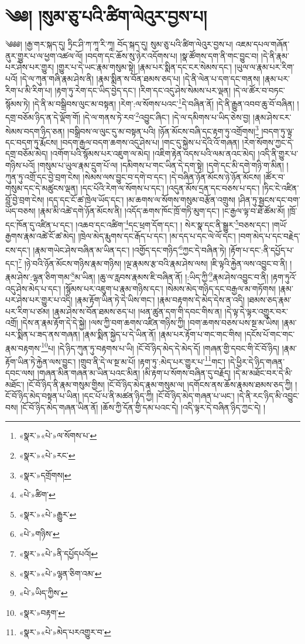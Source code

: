 \chapter{༄༅། །སུམ་ཅུ་པའི་ཚིག་ལེའུར་བྱས་པ།}༄༅༅། །རྒྱ་གར་སྐད་དུ། ཏྲིང་ཤི་ཀ་ཀཱ་རི་ཀཱ། བོད་སྐད་དུ། སུམ་ཅུ་པའི་ཚིག་ལེའུར་བྱས་པ། འཇམ་དཔལ་གཞོན་ནུར་གྱུར་པ་ལ་ཕྱག་འཚལ་ལོ། །བདག་དང་ཆོས་སུ་ཉེར་འདོགས་པ། །སྣ་ཚོགས་དག་ནི་གང་བྱུང་བ། །དེ་ནི་རྣམ་པར་ཤེས་པར་གྱུར། །གྱུར་པ་དེ་ཡང་རྣམ་གསུམ་སྟེ། །རྣམ་པར་སྨིན་དང་ངར་སེམས་དང་། །ཡུལ་ལ་རྣམ་པར་རིག་པའོ། །དེ་ལ་ཀུན་གཞི་རྣམ་ཤེས་ནི། །རྣམ་སྨིན་ས་བོན་ཐམས་ཅད་པ། །དེ་ནི་ལེན་པ་དག་དང་གནས། །རྣམ་པར་རིག་པ་མི་རིག་པ། །རྟག་ཏུ་རེག་དང་ཡིད་བྱེད་དང་། །རིག་དང་འདུ་ཤེས་སེམས་པར་ལྡན། །དེ་ལ་ཚོར་བ་བཏང་སྙོམས་ཏེ། །དེ་ནི་མ་བསྒྲིབས་ལུང་མ་བསྟན། །རེག་:ལ་སོགས་པའང་\footnote{«སྣར་»«པེ་»ལ་སོགས་པ་}དེ་བཞིན་ནོ། །དེ་ནི་རྒྱུན་འབབ་ཆུ་བོ་བཞིན། །དགྲ་བཅོམ་ཉིད་ན་དེ་ལྡོག་གོ། །དེ་ལ་གནས་ཏེ་རབ་\footnote{«སྣར་»«པེ་»རང་}འབྱུང་ཞིང་། །དེ་ལ་དམིགས་པ་ཡིད་ཅེས་བྱ། །རྣམ་ཤེས་ངར་སེམས་བདག་ཉིད་ཅན། །བསྒྲིབས་ལ་ལུང་དུ་མ་བསྟན་པའི། །ཉོན་མོངས་བཞི་དང་རྟག་ཏུ་འགྲོགས།\footnote{«སྣར་»དགྲོགས།} །བདག་ཏུ་ལྟ་དང་བདག་ཏུ་རྨོངས། །བདག་རྒྱལ་བདག་ཆགས་འདུ་ཤེས་པ། །གང་དུ་སྐྱེས་པ་དེའི་འོ་གཞན། །རེག་སོགས་ཀྱང་དེ་དགྲ་བཅོམ་མེད། །འགོག་པའི་སྙོམས་པར་འཇུག་ལ་མེད། །འཇིག་རྟེན་འདས་པའི་ལམ་ནའང་མེད། །འདི་ནི་གྱུར་པ་གཉིས་པའོ། །གསུམ་པ་ཡུལ་རྣམ་དྲུག་པོ་ལ། །དམིགས་པ་གང་ཡིན་དེ་དག་སྟེ། །དགེ་དང་མི་དགེ་གཉི་ག་མིན། །ཀུན་ཏུ་འགྲོ་དང་བྱེ་བྲག་ངེས། །སེམས་ལས་བྱུང་བ་དགེ་བ་དང་། །དེ་བཞིན་ཉོན་མོངས་ཉེ་ཉོན་མོངས། །ཚོར་བ་གསུམ་དང་དེ་མཚུངས་ལྡན། །དང་པོའི་རེག་ལ་སོགས་པ་དང་། །འདུན་མོས་དྲན་དང་བཅས་པ་དང་། །ཏིང་ངེ་འཛིན་བློ་བྱེ་བྲག་ངེས། །དད་དང་ངོ་ཚ་ཁྲེལ་ཡོད་དང་། །མ་ཆགས་ལ་སོགས་གསུམ་བརྩོན་འགྲུས། །ཤིན་ཏུ་སྦྱངས་དང་བག་ཡོད་བཅས། །རྣམ་མི་འཚེ་དགེ་ཉོན་མོངས་ནི། །འདོད་ཆགས་ཁོང་ཁྲོ་གཏི་མུག་དང་། །ང་རྒྱལ་ལྟ་བ་ཐེ་ཚོམ་མོ། །ཁྲོ་དང་ཁོན་དུ་འཛིན་པ་དང་། །འཆབ་དང་འཚིག་\footnote{«པེ་»ཚིག་}དང་ཕྲག་དོག་དང་། །
སེར་སྣ་དང་ནི་སྒྱུར་\footnote{«སྣར་»«པེ་»རྒྱུར་}བཅས་དང་། །གཡོ་རྒྱགས་རྣམ་འཚེ་ངོ་ཚ་མེད། །ཁྲེལ་མེད་རྨུགས་དང་རྒོད་པ་དང་། །མ་དད་པ་དང་ལེ་ལོ་དང་། །བག་མེད་པ་དང་བརྗེད་ངས་དང་། །རྣམ་གཡེང་ཤེས་བཞིན་མ་ཡིན་དང་། །འགྱོད་དང་གཉིད་\footnote{«པེ་»གཉིས་}ཀྱང་དེ་བཞིན་ཏེ། །རྟོག་པ་དང་:ནི་དཔྱོད་པ་དང་།\footnote{«སྣར་»«པེ་»ནི་དཔྱོདཔའོ།} །ཉེ་བའི་ཉོན་མོངས་གཉིས་རྣམ་གཉིས། །ལྔ་རྣམས་རྩ་བའི་རྣམ་ཤེས་ལས། །ཇི་ལྟའི་རྐྱེན་ལས་འབྱུང་བ་ནི། །རྣམ་ཤེས་:ལྷན་ཅིག་གམ་\footnote{«སྣར་»«པེ་»ལྷན་ཅིག་འམ་}མ་ཡིན། །ཆུ་ལ་རླབས་རྣམས་ཇི་བཞིན་ནོ། །:ཡིད་ཀྱི་\footnote{«པེ་»ཡིད་ཀྱིས་}རྣམ་ཤེས་འབྱུང་བ་ནི། །རྟག་ཏུའོ་འདུ་ཤེས་མེད་པ་དང་། །སྙོམས་པར་འཇུག་པ་རྣམ་གཉིས་དང་། །སེམས་མེད་གཉིད་དང་བརྒྱལ་མ་གཏོགས། །རྣམ་པར་ཤེས་པར་གྱུར་པ་འདི། །རྣམ་རྟོག་ཡིན་ཏེ་དེ་ཡིས་གང་། །རྣམ་བརྟགས་དེ་མེད་དེས་ན་འདི། །ཐམས་ཅད་རྣམ་པར་རིག་པ་ཙམ། །རྣམ་ཤེས་ས་བོན་ཐམས་ཅད་པ། །ཕན་ཚུན་དག་གི་དབང་གིས་ན། །དེ་ལྟ་དེ་ལྟར་འགྱུར་བར་འགྲོ། །དེས་ན་རྣམ་རྟོག་དེ་དེ་སྐྱེ། །ལས་ཀྱི་བག་ཆགས་འཛིན་གཉིས་ཀྱི། །བག་ཆགས་བཅས་པས་སྔ་མ་ཡིས། །རྣམ་པར་སྨིན་པ་ཟད་ནས་གཞན། །རྣམ་སྨིན་སྐྱེད་པ་དེ་ཡིན་ནོ། །རྣམ་པར་རྟོག་པ་གང་གང་གིས། །དངོས་པོ་གང་གང་རྣམ་བརྟགས་\footnote{«སྣར་»བརྟག་}པ། །དེ་ཉིད་ཀུན་ཏུ་བརྟགས་པ་ཡི། །ངོ་བོ་ཉིད་མེད་དེ་མེད་དོ། །གཞན་གྱི་དབང་གི་ངོ་བོ་ཉིད། །རྣམ་རྟོག་ཡིན་ཏེ་རྐྱེན་ལས་བྱུང་། །གྲུབ་ནི་དེ་ལ་སྔ་མ་པོ། །རྟག་ཏུ་:མེད་པར་གྱུར་པ་\footnote{«སྣར་»«པེ་»མེད་པརའགྱུར་བ་}གང་། །དེ་ཕྱིར་དེ་ཉིད་གཞན་དབང་ལས། །གཞན་མིན་གཞན་མ་ཡིན་པའང་མིན། །མི་རྟག་པ་སོགས་བཞིན་དུ་བརྗོད། །དེ་མ་མཐོང་བར་དེ་མི་མཐོང་། །ངོ་བོ་ཉིད་ནི་རྣམ་གསུམ་གྱིས། །ངོ་བོ་ཉིད་མེད་རྣམ་གསུམ་ལ། །དགོངས་ནས་ཆོས་རྣམས་ཐམས་ཅད་ཀྱི། །ངོ་བོ་ཉིད་མེད་བསྟན་པ་ཡིན། །དང་པོ་པ་ནི་མཚན་ཉིད་ཀྱི། །ངོ་བོ་ཉིད་མེད་གཞན་པ་ཡང་། །དེ་ནི་རང་ཉིད་མི་འབྱུང་བས། །ངོ་བོ་ཉིད་མེད་གཞན་ཡིན་ནོ། །ཆོས་ཀྱི་དོན་གྱི་དམ་པའང་དེ། །འདི་ལྟར་དེ་བཞིན་ཉིད་ཀྱང་དེ། །
